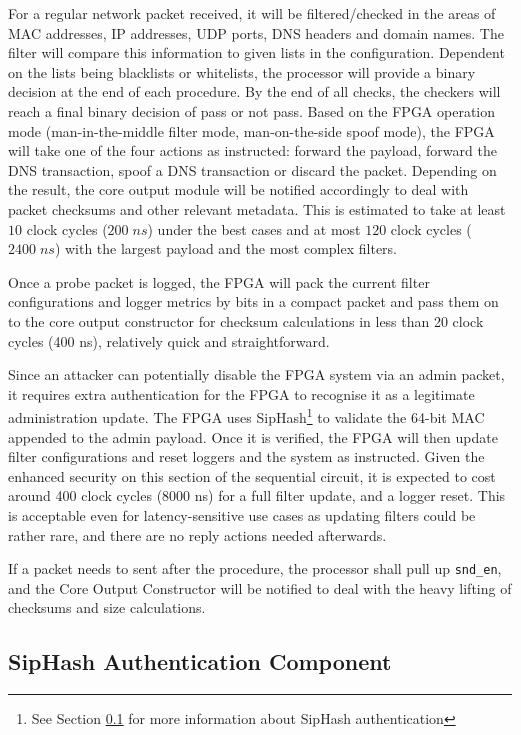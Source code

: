\documentclass[a4paper]{report}
\newcommand{\code}{\texttt}
\begin{document}
For a regular network packet received, it will be filtered/checked in the areas of MAC addresses, IP addresses, UDP ports, DNS headers and domain names. The filter will compare this information to given lists in the configuration. Dependent on the lists being blacklists or whitelists, the processor will provide a binary decision at the end of each procedure. By the end of all checks, the checkers will reach a final binary decision of pass or not pass. Based on the FPGA operation mode (man-in-the-middle filter mode, man-on-the-side spoof mode), the FPGA will take one of the four actions as instructed: forward the payload, forward the DNS transaction, spoof a DNS transaction or discard the packet. Depending on the result, the core output module will be notified accordingly to deal with packet checksums and other relevant metadata. This is estimated to take at least $10$ clock cycles ($200\; ns$) under the best cases and at most $120$ clock cycles ($2400\; ns$) with the largest payload and the most complex filters.  

Once a probe packet is logged, the FPGA will pack the current filter configurations and logger metrics by bits in a compact packet and pass them on to the core output constructor for checksum calculations in less than 20 clock cycles (400 ns), relatively quick and straightforward.

Since an attacker can potentially disable the FPGA system via an admin packet, it requires extra authentication for the FPGA to recognise it as a legitimate administration update. The FPGA uses SipHash\footnote{See Section \ref{section:implementation-hardware-implementation-siphash} for more information about SipHash authentication} to validate the 64-bit MAC appended to the admin payload. Once it is verified, the FPGA will then update filter configurations and reset loggers and the system as instructed. Given the enhanced security on this section of the sequential circuit, it is expected to cost around 400 clock cycles (8000 ns) for a full filter update, and a logger reset. This is acceptable even for latency-sensitive use cases as updating filters could be rather rare, and there are no reply actions needed afterwards.

If a packet needs to sent after the procedure, the processor shall pull up \code{snd\_en}, and the Core Output Constructor will be notified to deal with the heavy lifting of checksums and size calculations.

\subsection{SipHash Authentication Component}
\label{section:implementation-hardware-implementation-siphash}
\end{document}
